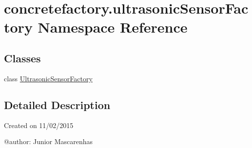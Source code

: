 \hypertarget{namespaceconcretefactory_1_1ultrasonicSensorFactory}{}\section{concretefactory.\+ultrasonic\+Sensor\+Factory Namespace Reference}
\label{namespaceconcretefactory_1_1ultrasonicSensorFactory}
\subsection*{Classes}
\begin{DoxyCompactItemize}
\item 
class \hyperlink{classconcretefactory_1_1ultrasonicSensorFactory_1_1UltrasonicSensorFactory}{Ultrasonic\+Sensor\+Factory}
\end{DoxyCompactItemize}


\subsection{Detailed Description}
\begin{DoxyVerb}Created on 11/02/2015

@author: Junior Mascarenhas
\end{DoxyVerb}
 